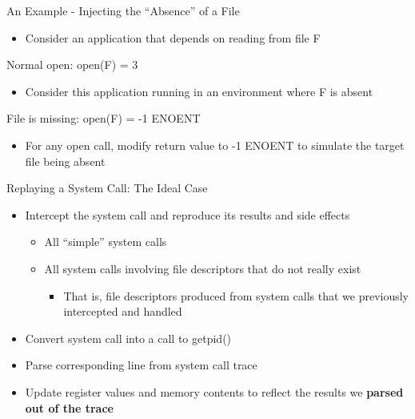 \documentclass[pdf]{beamer}
\begin{document}
\begin{frame}{An Example - Injecting the ``Absence'' of a File}
  \begin{itemize}
  \item{Consider an application that depends on reading from file F}
  \end{itemize}

  Normal open: open(F) = 3

  \begin{itemize}
  \item{Consider this application running in an environment where F is absent}
  \end{itemize}

  File is missing: open(F) = -1 ENOENT

  \begin{itemize}
  \item{For any open call, modify return value to -1 ENOENT to simulate the
      target file being absent}
  \end{itemize}
\end{frame}


\begin{frame}{Replaying a System Call: The Ideal Case}
  \begin{itemize}
  \item{Intercept the system call and reproduce its results and side effects}
    \begin{itemize}
    \item{All ``simple'' system calls}
    \item{All system calls involving file descriptors that do not really exist}
      \begin{itemize}
      \item{That is, file descriptors produced from system calls that we
          previously intercepted and handled}
      \end{itemize}
    \end{itemize}
  \item{Convert system call into a call to getpid()}
  \item{Parse corresponding line from system call trace}
  \item{Update register values and memory contents to reflect the results we
      \textbf{parsed out of the trace}}
  \end{itemize}
\end{frame}
\end{document}
